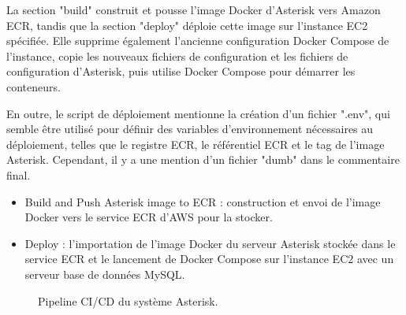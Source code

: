 La section "build" construit et pousse l'image Docker d'Asterisk vers Amazon ECR, tandis que la section "deploy" déploie cette image sur l'instance EC2 spécifiée. Elle supprime également l'ancienne configuration Docker Compose de l'instance, copie les nouveaux fichiers de configuration et les fichiers de configuration d'Asterisk, puis utilise Docker Compose pour démarrer les conteneurs.

En outre, le script de déploiement mentionne la création d'un fichier ".env", qui semble être utilisé pour définir des variables d'environnement nécessaires au déploiement, telles que le registre ECR, le référentiel ECR et le tag de l'image Asterisk. Cependant, il y a une mention d'un fichier "dumb" dans le commentaire final.
\begin{itemize}
    \item Build and Push Asterisk image to ECR : construction et envoi de l’image Docker vers le service ECR d’AWS pour la stocker.
    \item Deploy : l’importation de l’image Docker du serveur Asterisk stockée dans le service ECR et le lancement de Docker Compose sur l’instance EC2 avec un serveur base de données MySQL.
\end{itemize}

\begin{figure}[H]
        \centering
        \caption{Pipeline CI/CD du système Asterisk.}
        \label{fig:cicd}
        \end{figure}

